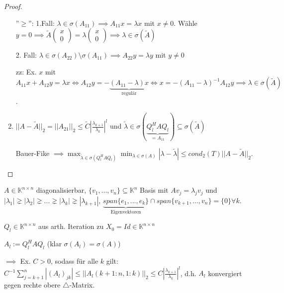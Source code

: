 \begin{proof}
\begin{enumerate}
		''$\geq$'': 1.Fall: $\lambda \in \sigma(A_{11}) \implies A_{11}x = \lambda x$ mit $x \neq 0$. Wähle $y=0 \implies \tilde{A}\left(\begin{matrix}
			x\\
			0
		\end{matrix}\right) = \lambda \left(\begin{matrix}
			x\\
			0
		\end{matrix}\right) \implies \lambda \in \sigma(\tilde{A})$
		
		2. Fall: $\lambda \in \sigma(A_{22}) \setminus \sigma(A_{11}) \implies A_{22}y = \lambda y$ mit $y \neq 0$
		
		zz: Ex. $x$ mit $A_{11} x + A_{12} y = \lambda x \iff A_{12}y = -\underbrace{(A_{11} - \lambda)x}_{\text{regulär}} \iff x = - (A_{11} - \lambda)^{-1}A_{12}y \implies \lambda \in \sigma(\tilde{A})$.
		
		\item $||A - \tilde{A}||_2 = ||A_{21}||_2 \leq \tilde{C} \left|\frac{\lambda_{k+1}}{\lambda_k}\right|^l$ und $\tilde{\lambda} \in \sigma(\underbrace{Q_l^HAQ_l}_{=A_{11}}) \subseteq \sigma(\tilde{A})$
		
		Bauer-Fike $\implies \max_{\tilde{\lambda} \in \sigma(Q_l^HAQ_l)} \min_{\lambda \in \sigma(A)} |\lambda - \tilde{\lambda}| \leq cond_2(T) ||A- \tilde{A}||_2$.
	\end{enumerate}
\end{proof}

\begin{corollary}
	$A \in \mathbb{K}^{n\times n}$ diagonalisierbar, $\{v_1, ..., v_n\} \subseteq \mathbb{K}^n$ Basis mit $Av_j = \lambda_jv_j$ und $|\lambda_1| \gneq |\lambda_2| \gneq ... \gneq |\lambda_k| \gneq |\lambda_{k+1}|$, $\underbrace{span\{e_1, ..., e_k\}}_{\text{Eigenvektoren}} \cap span\{v_{k+1}, ..., v_n\} = \{0\} \forall k$.
	
	$Q_l \in \mathbb{K}^{n\times n}$ aus arth. Iteration zu $X_0 = Id \in \mathbb{K}^{n\times n}$
	
	$A_l := Q_l^HAQ_l$ (klar $\sigma(A_l) = \sigma(A)$)
	
	$\implies$ Ex. $C > 0$, sodass für alle $k$ gilt: $C^{-1} \sum_{j=k+1}^{n}|(A_l)_{jk}| \leq ||A_l(k+1:n, 1:k)||_2 \leq C \left|\frac{\lambda_{k+1}}{\lambda_k}\right|^l$, d.h. $A_l$ konvergiert gegen rechte obere $\triangle$-Matrix.
\end{corollary}

